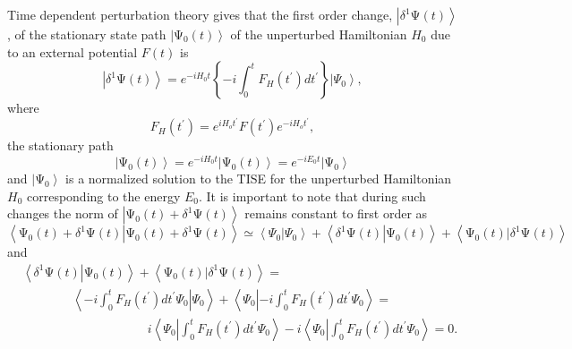 \documentclass[aps,preprint]{revtex4}%
\begin{document}
Time dependent perturbation theory gives that the first order change,
$\left\vert \delta^{1}\mathrm{\Psi}\left(  t\right)  \right\rangle $, of the
stationary state path $\left\vert \mathrm{\Psi}_{0}\left(  t\right)
\right\rangle $ of the unperturbed Hamiltonian $H_{0}$ due to an external
potential $F\left(  t\right)  $ is
\begin{equation}
\left\vert \delta^{1}\mathrm{\Psi}\left(  t\right)  \right\rangle
=e^{-iH_{0}t}\left\{  -i\int_{0}^{t}F_{H}\left(  t^{\prime}\right)
dt^{\prime}\right\}  \left\vert \Psi_{0}\right\rangle , \label{deltapsi}%
\end{equation}
where%
\begin{equation}
F_{H}\left(  t^{\prime}\right)  =e^{iH_{o}t^{\prime}}F\left(  t^{\prime
}\right)  e^{-iH_{o}t^{\prime}},
\end{equation}
the stationary path
\begin{equation}
\left\vert \mathrm{\Psi}_{0}\left(  t\right)  \right\rangle =e^{-iH_{0}%
t}\left\vert \mathrm{\Psi}_{0}\left(  t\right)  \right\rangle =e^{-iE_{0}%
t}\left\vert \mathrm{\Psi}_{0}\right\rangle
\end{equation}
and $\left\vert \mathrm{\Psi}_{0}\right\rangle $ is a normalized solution to
the TISE for the unperturbed Hamiltonian $H_{0}$ corresponding to the energy
$E_{0}$. It is important to note that during such changes the norm of
$\left\vert \mathrm{\Psi}_{0}\left(  t\right)  +\delta^{1}\mathrm{\Psi}\left(
t\right)  \right\rangle $ remains constant to first order as
\begin{equation}
\left\langle \left.  \mathrm{\Psi}_{0}\left(  t\right)  +\delta^{1}%
\mathrm{\Psi}\left(  t\right)  \right\vert \mathrm{\Psi}_{0}\left(  t\right)
+\delta^{1}\mathrm{\Psi}\left(  t\right)  \right\rangle \simeq\left\langle
\left.  \Psi_{0}\right\vert \Psi_{0}\right\rangle +\left\langle \left.
\delta^{1}\mathrm{\Psi}\left(  t\right)  \right\vert \mathrm{\Psi}_{0}\left(
t\right)  \right\rangle +\left\langle \left.  \mathrm{\Psi}_{0}\left(
t\right)  \right\vert \delta^{1}\mathrm{\Psi}\left(  t\right)  \right\rangle
\end{equation}
and
\begin{align}
&  \left\langle \left.  \delta^{1}\mathrm{\Psi}\left(  t\right)  \right\vert
\mathrm{\Psi}_{0}\left(  t\right)  \right\rangle +\left\langle \left.
\mathrm{\Psi}_{0}\left(  t\right)  \right\vert \delta^{1}\mathrm{\Psi}\left(
t\right)  \right\rangle =\nonumber\\
&  \qquad\qquad\left\langle \left.  -i\int_{0}^{t}F_{H}\left(  t^{\prime
}\right)  dt^{\prime}\Psi_{0}\right\vert \Psi_{0}\right\rangle +\left\langle
\Psi_{0}\left\vert -i\int_{0}^{t}F_{H}\left(  t^{\prime}\right)  dt^{\prime
}\right.  \Psi_{0}\right\rangle =\nonumber\\
&  \qquad\qquad\qquad\qquad\qquad i\left\langle \Psi_{0}\left\vert \int
_{0}^{t}F_{H}\left(  t^{\prime}\right)  dt^{\prime}\right.  \Psi
_{0}\right\rangle -i\left\langle \Psi_{0}\left\vert \int_{0}^{t}F_{H}\left(
t^{\prime}\right)  dt^{\prime}\right.  \Psi_{0}\right\rangle =0.
\end{align}
\end{document}
